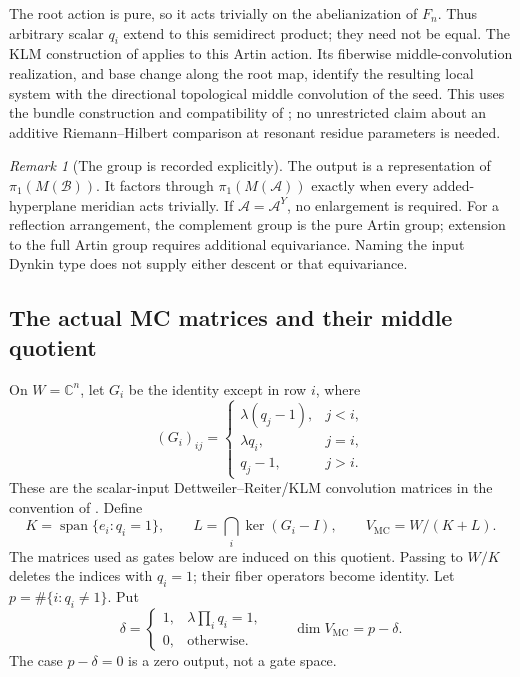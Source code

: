 \documentclass[11pt,a4paper]{article}
\theoremstyle{remark}\newtheorem{remark}[theorem]{Remark}
\newcommand{\C}{\mathbb C}
\newcommand{\A}{\mathcal A}
\newcommand{\B}{\mathcal B}
\newcommand{\MC}{\operatorname{MC}}
\begin{document}
The root action is pure, so it acts trivially on the abelianization of
$F_n$. Thus arbitrary scalar $q_i$ extend to this semidirect product;
they need not be equal. The KLM construction of \cite{HN} applies to this
Artin action. Its fiberwise middle-convolution realization, and base
change along the root map, identify the resulting local system with the
directional topological middle convolution of the seed. This uses the
bundle construction and compatibility of \cite{AH}; no unrestricted
claim about an additive Riemann--Hilbert comparison at resonant residue
parameters is needed.

\begin{remark}[The group is recorded explicitly]
The output is a representation of $\pi_1(M(\B))$. It factors through
$\pi_1(M(\A))$ exactly when every added-hyperplane meridian acts trivially.
If $\A=\A^Y$, no enlargement is required. For a reflection arrangement,
the complement group is the pure Artin group; extension to the full
Artin group requires additional equivariance. Naming the input Dynkin
type does not supply either descent or that equivariance.
\end{remark}

\subsection{The actual MC matrices and their middle quotient}
On $W=\C^n$, let $G_i$ be the identity except in row $i$, where
\begin{equation}\label{mc:eq:G}
 (G_i)_{ij}=\begin{cases}
 \lambda(q_j-1),&j<i,\\
 \lambda q_i,&j=i,\\
 q_j-1,&j>i.
 \end{cases}
\end{equation}
These are the scalar-input Dettweiler--Reiter/KLM convolution matrices
in the convention of \cite[Definition 9]{NegamiKZ}.
Define
\[
 K=\operatorname{span}\{e_i:q_i=1\},\qquad
 L=\bigcap_i\ker(G_i-I),\qquad V_{\MC}=W/(K+L).
\]
The matrices used as gates below are induced on this quotient.
Passing to $W/K$ deletes the indices with $q_i=1$; their fiber operators
become identity. Let $p=\#\{i:q_i\ne1\}$. Put
\[
 \delta=\begin{cases}1,&\lambda\prod_iq_i=1,\\0,&\text{otherwise.}\end{cases}
 \qquad \dim V_{\MC}=p-\delta.
\]
The case $p-\delta=0$ is a zero output, not a gate space.
\end{document}
